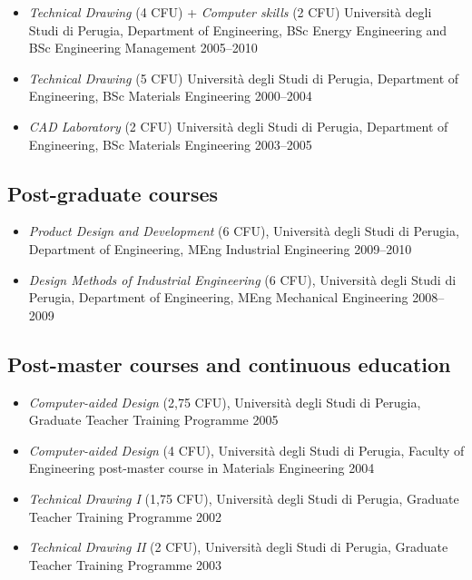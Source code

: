 \documentclass[11pt]{article}
\begin{document}
\begin{itemize}
	\item \emph{Technical Drawing} (4 CFU) + \emph{Computer skills} (2 CFU) Università degli Studi di Perugia, Department of Engineering, BSc Energy Engineering and BSc Engineering Management \mbox{} \hfill 2005--2010
	
  \item \emph{Technical Drawing} (5 CFU) Università degli Studi di Perugia, Department of Engineering, BSc Materials Engineering \mbox{} \hfill 2000--2004
 
 \item \emph{CAD Laboratory} (2 CFU) Università degli Studi di Perugia, Department of Engineering, BSc Materials Engineering \mbox{} \hfill 2003–2005
\end{itemize}

\subsection*{Post-graduate courses}

\begin{itemize}
	\item \emph{Product Design and Development} (6 CFU), Università degli Studi di Perugia, Department of Engineering, MEng Industrial Engineering \mbox{} \hfill 2009--2010
	\item \emph{Design Methods of Industrial Engineering} (6 CFU), Università degli Studi di Perugia, Department of Engineering, MEng Mechanical Engineering \mbox{} \hfill 2008--2009
\end{itemize}

\subsection*{Post-master courses and continuous education}

\begin{itemize}
	\item \emph{Computer-aided Design} (2,75 CFU), Università degli Studi di Perugia, Graduate Teacher Training Programme \mbox{} \hfill 2005
	\item \emph{Computer-aided Design} (4 CFU), Università degli Studi di Perugia, Faculty of Engineering post-master course in Materials Engineering \mbox{} \hfill 2004
  \item \emph{Technical Drawing I} (1,75 CFU), Università degli Studi di Perugia, Graduate Teacher Training Programme \mbox{} \hfill 2002
  \item \emph{Technical Drawing II} (2 CFU), Università degli Studi di Perugia, Graduate Teacher Training Programme \mbox{} \hfill 2003
\end{itemize}
\end{document}
